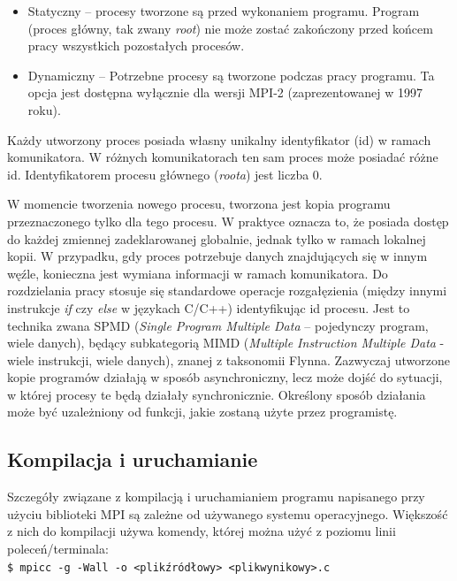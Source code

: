 \begin{itemize}
	\item Statyczny -- procesy tworzone są przed wykonaniem programu. Program (proces główny, tak zwany \textit{root}) nie może zostać zakończony przed końcem pracy wszystkich pozostałych procesów.
	\item Dynamiczny -- Potrzebne procesy są tworzone podczas pracy programu. Ta opcja jest dostępna wyłącznie dla wersji MPI-2 (zaprezentowanej w 1997 roku).
\end{itemize}

Każdy utworzony proces posiada własny unikalny identyfikator (id) w ramach komunikatora. W różnych komunikatorach ten sam proces może posiadać różne id. Identyfikatorem procesu głównego (\textit{roota}) jest liczba 0.

W momencie tworzenia nowego procesu, tworzona jest kopia programu przeznaczonego tylko dla tego procesu. W praktyce oznacza to, że posiada dostęp do każdej zmiennej zadeklarowanej globalnie, jednak tylko w ramach lokalnej kopii. W przypadku, gdy proces potrzebuje danych znajdujących się w innym węźle, konieczna jest wymiana informacji w ramach komunikatora. Do rozdzielania pracy stosuje się standardowe operacje rozgałęzienia (między innymi instrukcje \textit{if} czy \textit{else} w językach C/C++) identyfikując id procesu. Jest to technika zwana SPMD (\textit{Single Program Multiple Data} -- pojedynczy program, wiele danych), będący subkategorią MIMD (\textit{Multiple Instruction Multiple Data} - wiele instrukcji, wiele danych), znanej z taksonomii Flynna. Zazwyczaj utworzone kopie programów działają w sposób asynchroniczny, lecz może dojść do sytuacji, w której procesy te będą działały synchronicznie. Określony sposób działania może być uzależniony od funkcji, jakie zostaną użyte przez programistę.

\subsection{Kompilacja i uruchamianie}

Szczegóły związane z kompilacją i uruchamianiem programu napisanego przy użyciu biblioteki MPI są zależne od używanego systemu operacyjnego. Większość z nich do kompilacji używa komendy, której można użyć z poziomu linii poleceń/terminala: \\

\texttt{\$ mpicc -g -Wall -o <plik\textunderscore źródłowy> <plik\textunderscore wynikowy>.c} \\

